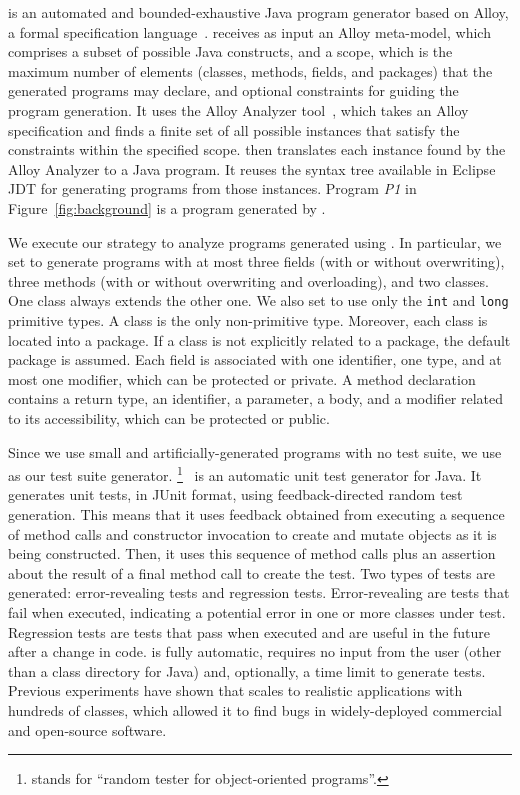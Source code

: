 \jdolly{} is an automated and bounded-exhaustive Java program generator based on Alloy, a formal specification language~\cite{alloy-book}. 
\jdolly{} receives as input an Alloy meta-model, which comprises a subset of possible Java constructs, and a scope, which is the maximum number of elements (classes, methods, fields, and packages) that the generated programs may declare, and optional constraints for guiding the program generation. 
It uses the Alloy Analyzer tool~\cite{alcoa}, which takes an Alloy specification and finds a finite set of all possible instances that satisfy the constraints within the specified scope. 
\jdolly{} then translates each instance found by the Alloy Analyzer to a Java program. 
It reuses the syntax tree available in Eclipse JDT for generating programs from those instances. 
Program \textit{P1} in Figure~\ref{fig:background} is a program generated by \jdolly{}. 

We execute our strategy to analyze \AnalyzedPrograms programs generated using \jdolly{}. 
In particular, we set \jdolly{} to generate programs with at most three fields (with or without overwriting), three methods (with or without overwriting and overloading), and two classes. 
One class always extends the other one. 
We also set \jdolly{} to use only the \texttt{int} and \texttt{long} primitive types. 
A class is the only non-primitive type. 
Moreover, each class is located into a package. 
If a class is not explicitly related to a package, the default package is assumed. 
Each field is associated with one identifier, one type, and at most one modifier, which can be protected or private. 
A method declaration contains a return type, an identifier, a parameter, a body, and a modifier related to its accessibility, which can be protected or public.

Since we use small and artificially-generated programs with no test suite, we  use \randoop{} as our test suite generator.
\randoop{}\footnote{\randoop{} stands for ``random tester for object-oriented programs''.}~\cite{PACHECO:2007:1} is an automatic unit test generator for Java. 
It generates unit tests, in JUnit format, using feedback-directed random test generation.
This means that it uses feedback obtained from executing a sequence of method calls and constructor invocation to create and mutate objects as it is being constructed. Then, it  uses this sequence of method calls plus an assertion about the result of a final method call to create the test.
Two types of tests are generated: error-revealing tests and regression tests. 
Error-revealing are tests that fail when executed, indicating a potential error in one or more classes under test.
Regression tests are tests that pass when executed and are useful in the future after a change in code.
\randoop{} is fully automatic, requires no input from the user (other than a class directory for Java) and, optionally, a time limit to generate tests. 
Previous experiments \cite{PACHECO:2007:1, PACHECO:2008:1} have shown that \randoop{} scales to realistic applications with hundreds of classes, which allowed it to find bugs in widely-deployed commercial and open-source software.

